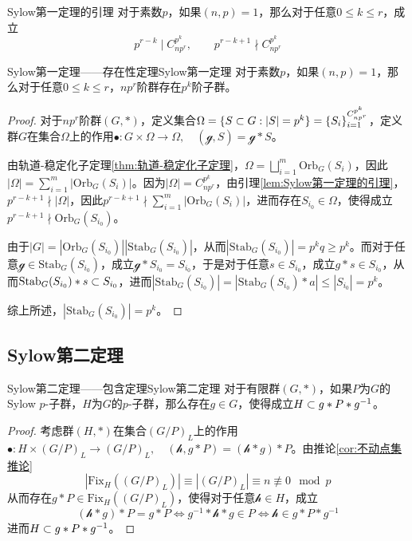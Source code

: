 \begin{lemma}{}{Sylow第一定理的引理}
	对于素数$p$，如果$(n,p)=1$，那么对于任意$0\le k\le r$，成立
	$$
	p^{r-k}\mid C_{np^r}^{p^k},\qquad 
	p^{r-k+1}\nmid C_{np^r}^{p^k}
	$$
\end{lemma}

\begin{theorem}{Sylow第一定理——存在性定理}{Sylow第一定理}
	对于素数$p$，如果$(n,p)=1$，那么对于任意$0\le k\le r$，$np^r$阶群存在$p^k$阶子群。
\end{theorem}

\begin{proof}
	对于$np^r$阶群$(G,*)$，定义集合$\Omega=\{ S\subset G:|S|=p^k \}=\{S_i\}_{i=1}^{C_{np^r}^{p^k}}$，定义群$G$在集合$\Omega$上的作用$\bullet:G\times \Omega\to \Omega,\quad (\mathcal{g},S)=\mathcal{g}*S$。
	
	由轨道-稳定化子定理\ref{thm:轨道-稳定化子定理}，$\displaystyle \Omega=\bigsqcup_{i=1}^{m}\mathrm{Orb}_G(S_i)$，因此$\displaystyle |\Omega|=\sum_{i=1}^{m}|\mathrm{Orb}_G(S_i)|$。因为$|\Omega|=C_{np^r}^{p^k}$，由引理\ref{lem:Sylow第一定理的引理}，$p^{r-k+1}\nmid |\Omega|$，因此$\displaystyle p^{r-k+1}\nmid\sum_{i=1}^{m}|\mathrm{Orb}_G(S_i)|$，进而存在$S_{i_0}\in \Omega$，使得成立$p^{r-k+1}\nmid\mathrm{Orb}_G(S_{i_0})$。
	
	由于$|G|=|\mathrm{Orb}_G(S_{i_0})||\mathrm{Stab}_G(S_{i_0})|$，从而$|\mathrm{Stab}_G(S_{i_0})|=p^kq\ge p^k$。而对于任意$\mathcal{g}\in \mathrm{Stab}_G(S_{i_0})$，成立$\mathcal{g}*S_{i_0}=S_{i_0}$，于是对于任意$s\in S_{i_0}$，成立$g*s\in S_{i_0}$，从而$\mathrm{Stab}_G(S_{i_0})*s\subset S_{i_0}$，进而$|\mathrm{Stab}_G(S_{i_0})|=|\mathrm{Stab}_G(S_{i_0})*a|\le|S_{i_0}|=p^{k}$。
	
	综上所述，$|\mathrm{Stab}_G(S_{i_0})|=p^k$。
\end{proof}

\subsection{Sylow第二定理}

\begin{theorem}{Sylow第二定理——包含定理}{Sylow第二定理}
	对于有限群$(G,*)$，如果$P$为$G$的Sylow $p$-子群，$H$为$G$的$p$-子群，那么存在$g\in G$，使得成立$H\subset g*P*g^{-1}$。
\end{theorem}

\begin{proof}
	考虑群$(H,*)$在集合$(G/P)_L$上的作用$\bullet:H\times (G/P)_L\to (G/P)_L,\quad (\mathcal{h},g*P)=(\mathcal{h}*g)*P$。由推论\ref{cor:不动点集推论}
	$$
	|\mathrm{Fix}_H((G/P)_L)|\equiv |(G/P)_L|\equiv n\not\equiv 0\mod p
	$$
	从而存在$g*P\in \mathrm{Fix}_H((G/P)_L)$，使得对于任意$\mathcal{h}\in H$，成立
	$$
	(\mathcal{h}*g)*P=g*P\iff g^{-1}*\mathcal{h}*g\in P\iff \mathcal{h}\in g*P*g^{-1}
	$$
	进而$H\subset g*P*g^{-1}$。
\end{proof}

